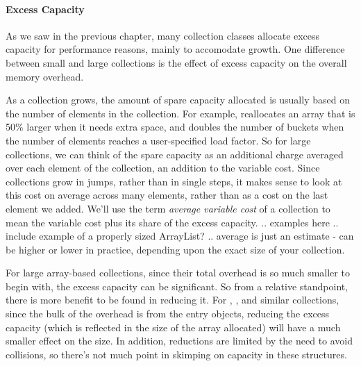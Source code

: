 
\paragraph{Excess Capacity}

As we saw in the previous chapter, many collection
classes allocate excess capacity for performance reasons, mainly to accomodate
growth. One difference between small and large collections is the
effect of excess capacity on the overall memory overhead.  

As a collection grows, the amount of spare capacity allocated is usually based
on the number of elements in the collection. For example,  reallocates an array that is 50\% larger
when it needs extra space, and  doubles the number of buckets when the number of elements reaches
a user-specified load factor. So for large collections, we can think of the spare capacity as an additional charge
averaged over each element of the collection, an addition to the variable cost.
Since collections grow in jumps, rather than in single steps, it makes sense to look at this cost
on average across many elements, rather than as a cost on the last element we
added. We'll use the term \emph{average variable cost} of a collection to mean the variable cost
plus its share of the excess capacity.    .. examples here .. 
include example of a properly sized ArrayList? .. average is just an estimate - can be higher or lower in practice, depending
upon the exact size of your collection.

For large array-based collections, since their total overhead is
so much smaller to begin with, the excess capacity can be significant. So from a
relative standpoint, there is more benefit to be found in reducing it.  For
, , and similar collections, since the bulk of the overhead is from the entry objects,
reducing the excess capacity (which is
reflected in the size of the array allocated) will have a much smaller effect on
the size.  In addition, reductions are limited by the need to avoid
collisions, so there's not much point in skimping on capacity in these
structures.


